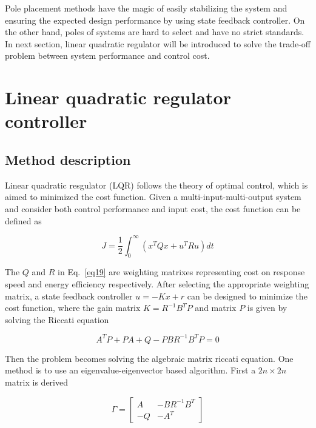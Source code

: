 \documentclass[hyperref]{article}
\theoremstyle{nonumberplain}
\begin{document}
	Pole placement methods have the magic of easily stabilizing the system and ensuring the expected design performance by using state feedback controller. On the other hand, poles of systems are hard to select and have no strict standards. In next section, linear quadratic regulator will be introduced to solve the trade-off problem between system performance and control cost.
	
	
	\section{Linear quadratic regulator controller}
	
	\subsection{Method description}
	
	\hspace{1.0em}
	Linear quadratic resgulator (LQR) follows the theory of optimal control, which is aimed to minimized the cost function. Given a multi-input-multi-output system and consider both control performance and input cost, the cost function can be defined as
	
	\begin{equation}
	J=\frac{1}{2}\int_{0}^{\infty}(x^{T}Qx+u^{T}Ru)dt
	\label{eq19}
	\end{equation}
	
	The $Q$ and $R$ in Eq.~\ref{eq19} are weighting matrixes representing cost on response speed and energy efficiency respectively. After selecting the appropriate weighting matrix, a state feedback controller $u=-Kx+r$ can be designed to minimize the cost function, where the gain matrix $K=R^{-1}B^{T}P$ and matrix $P$ is given by solving the Riccati equation
	
	\begin{equation}
	A^{T}P+PA+Q-PBR^{-1}B^{T}P=0
	\label{eq20}
	\end{equation}
	
	Then the problem becomes solving the algebraic matrix riccati equation. One method is to use an eigenvalue-eigenvector based algorithm. First a $2n \times 2n$ matrix is derived
	
	\begin{equation}
	\Gamma =\begin{bmatrix}
	A &-BR^{-1}B^{T} \\ 
	-Q &-A^{T} 
	\end{bmatrix}
	\label{eq21}
	\end{equation}
	
\end{document}
